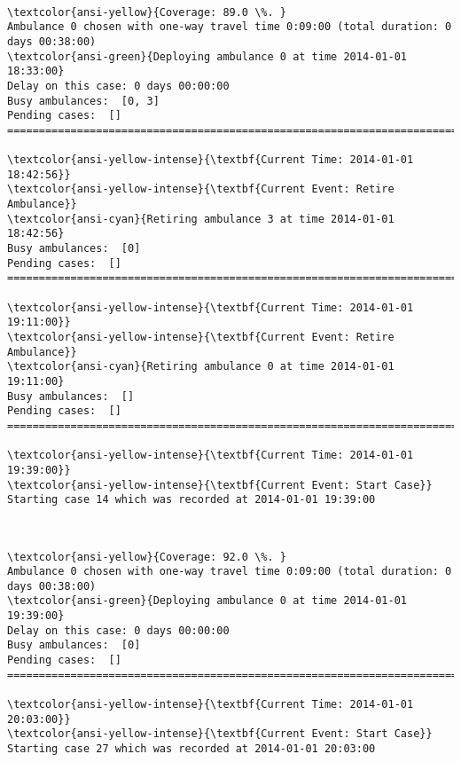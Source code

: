 \documentclass[11pt]{article}
\begin{document}
    \begin{center}
    \end{center}
    { \hspace*{\fill} \\}
    
    \begin{Verbatim}[commandchars=\\\{\}]
\textcolor{ansi-yellow}{Coverage: 89.0 \%. }
Ambulance 0 chosen with one-way travel time 0:09:00 (total duration: 0 days 00:38:00)
\textcolor{ansi-green}{Deploying ambulance 0 at time 2014-01-01 18:33:00}
Delay on this case: 0 days 00:00:00
Busy ambulances:  [0, 3]
Pending cases:  []
========================================================================

\textcolor{ansi-yellow-intense}{\textbf{Current Time: 2014-01-01 18:42:56}}
\textcolor{ansi-yellow-intense}{\textbf{Current Event: Retire Ambulance}}
\textcolor{ansi-cyan}{Retiring ambulance 3 at time 2014-01-01 18:42:56}
Busy ambulances:  [0]
Pending cases:  []
========================================================================

\textcolor{ansi-yellow-intense}{\textbf{Current Time: 2014-01-01 19:11:00}}
\textcolor{ansi-yellow-intense}{\textbf{Current Event: Retire Ambulance}}
\textcolor{ansi-cyan}{Retiring ambulance 0 at time 2014-01-01 19:11:00}
Busy ambulances:  []
Pending cases:  []
========================================================================

\textcolor{ansi-yellow-intense}{\textbf{Current Time: 2014-01-01 19:39:00}}
\textcolor{ansi-yellow-intense}{\textbf{Current Event: Start Case}}
Starting case 14 which was recorded at 2014-01-01 19:39:00

    \end{Verbatim}

    \begin{center}
    \end{center}
    { \hspace*{\fill} \\}
    
    \begin{Verbatim}[commandchars=\\\{\}]
\textcolor{ansi-yellow}{Coverage: 92.0 \%. }
Ambulance 0 chosen with one-way travel time 0:09:00 (total duration: 0 days 00:38:00)
\textcolor{ansi-green}{Deploying ambulance 0 at time 2014-01-01 19:39:00}
Delay on this case: 0 days 00:00:00
Busy ambulances:  [0]
Pending cases:  []
========================================================================

\textcolor{ansi-yellow-intense}{\textbf{Current Time: 2014-01-01 20:03:00}}
\textcolor{ansi-yellow-intense}{\textbf{Current Event: Start Case}}
Starting case 27 which was recorded at 2014-01-01 20:03:00

    \end{Verbatim}
\end{document}
